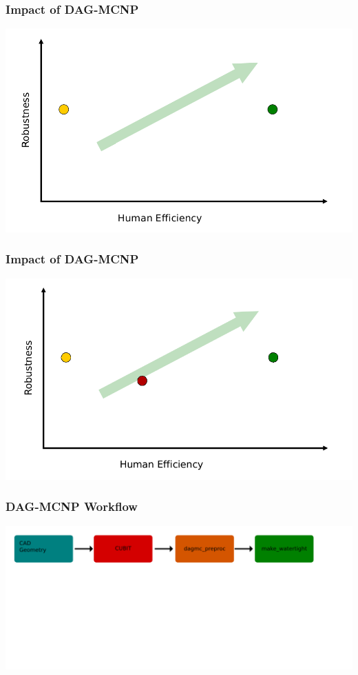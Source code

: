 \documentclass[14pt]{beamer}
\begin{document}
\begin{frame}
\frametitle{Impact of DAG-MCNP}
\vfill
\includegraphics[scale=0.35]{QualityGraph.png}
\end{frame}

\begin{frame}
\frametitle{Impact of DAG-MCNP}
\includegraphics[scale=0.43, trim = 0 0 28 0]{InitialGraphImpact.png}
\end{frame}


\begin{frame}
\frametitle{DAG-MCNP Workflow}
\includegraphics[scale=0.25, trim = 40 400 0 0]{DAGMC_Wrkflw1.png}
\end{frame}
\end{document}
